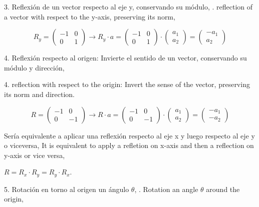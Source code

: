 \begin{paracol}{2}
3. Reflexión de un vector respecto al eje y, conservando su módulo,
. reflection of a vector with respect to the y-axis, preserving its norm, 
\end{paracol}
\begin{equation*}
R_y=\begin{pmatrix}
-1& 0\\
0& 1
\end{pmatrix} \rightarrow R_y\cdot a = \begin{pmatrix}
-1& 0\\
0& 1
\end{pmatrix} \cdot \begin{pmatrix}
a_1\\
a_2
\end{pmatrix}= \begin{pmatrix}
-a_1\\
a_2
\end{pmatrix}
\end{equation*}
\begin{paracol}{2}
4. Reflexión respecto al origen: Invierte el sentido de un vector, conservando su módulo y dirección,
\switchcolumn

4. reflection with respect to the origin: Invert the sense of the vector, preserving its norm and direction. 
\end{paracol}
\begin{equation*}
R=\begin{pmatrix}
-1& 0\\
0& -1
\end{pmatrix} \rightarrow R\cdot a = \begin{pmatrix}
-1& 0\\
0& -1
\end{pmatrix} \cdot \begin{pmatrix}
a_1\\
a_2
\end{pmatrix}= \begin{pmatrix}
-a_1\\
-a_2
\end{pmatrix}
\end{equation*}
\begin{paracol}{2}
Sería equivalente a aplicar una reflexión respecto al eje x y luego respecto al eje y o viceversa,
\switchcolumn
It is equivalent to apply a refletion on x-axis and then a reflection on y-axis or vice versa,
\end{paracol}
$R=R_x\cdot R_y= R_y\cdot R_x$.
\begin{paracol}{2}
 5. Rotación en torno al origen un ángulo $\theta$,
 . Rotation an angle $\theta$ around the origin,
\end{paracol}
